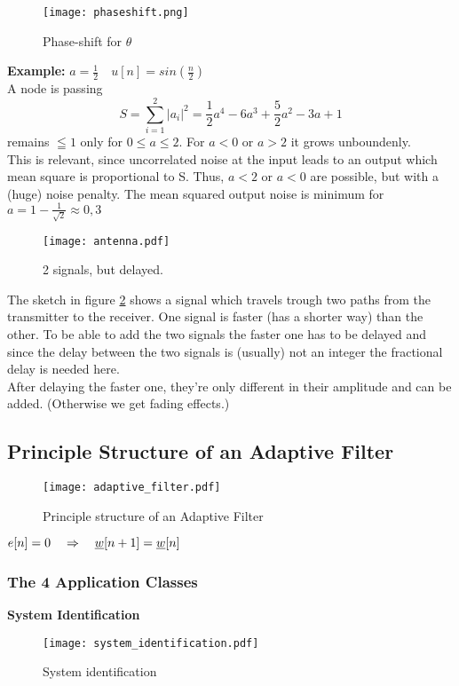 \begin{figure}[H]
	\centering
	\texttt{[image: phaseshift.png]}
	\caption{Phase-shift for $\theta$}
	\label{phaseshift} 
\end{figure}

\textbf{Example:} $a=\frac{1}{2} \quad u[n]=sin(\frac{n}{2})$\\
A node is passing \[ S= \sum_{i=1}^2 |a_i|^2 = \frac{1}{2}a^4 - 6a^3 +\frac{5}{2} a^2 - 3a+1\] remains $\leqq 1$ only for $0\leq a\leq 2$. For $a < 0  $ or $a > 2$ it grows unboundenly.\\ This is relevant, since uncorrelated noise at the input leads to an output which mean square is proportional to S. Thus, $a < 2$ or $a < 0$ are possible, but with a (huge) noise penalty. The mean squared output noise is minimum for $a = 1-\frac{1}{\sqrt{2}} \approx 0,3$
\begin{figure}[H]
	\centering
	\texttt{[image: antenna.pdf]}
	\caption{2 signals, but delayed.}
	\label{delayedsignal} 
\end{figure}
The sketch in figure \ref{delayedsignal} shows a signal which travels trough two paths from the transmitter to the receiver. One signal is faster (has a shorter way) than the other. To be able to add the two signals the faster one has to be delayed and since the delay between the two signals is (usually) not an integer the fractional delay is needed here.\\
 \pfeil After delaying the faster one, they're only different in their amplitude and can be added. (Otherwise we get fading effects.)

\subsection{Principle Structure of an Adaptive Filter}


\begin{figure}[H]
	\centering
	\texttt{[image: adaptive\_filter.pdf]}
	\caption{Principle structure of an Adaptive Filter}
	\label{adaptive_filter} 
\end{figure}

$e[n] = 0 \quad\Rightarrow\quad \underline{w} [n+1] = \underline{w} [n]$
\subsubsection{The 4 Application Classes}
\textbf{System Identification}
	\begin{figure}[H]
		\centering
		\texttt{[image: system\_identification.pdf]}
		\caption{System identification}
		\label{system_identification} 
	\end{figure}


